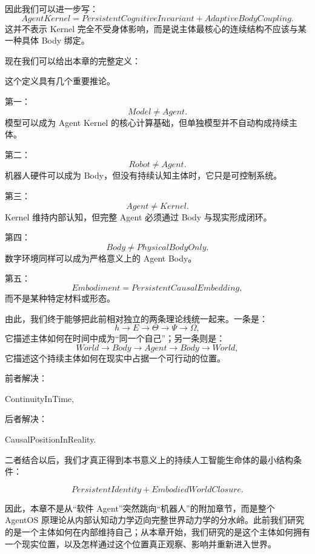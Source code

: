 因此我们可以进一步写：
\[
\boxed{
AgentKernel
=
PersistentCognitiveInvariant
+
AdaptiveBodyCoupling.
}
\]
这并不表示 Kernel 完全不受身体影响，而是说主体最核心的连续结构不应该与某一种具体 Body 绑定。

现在我们可以给出本章的完整定义：

\begin{statementbox}
\centering
{}
\end{statementbox}

这个定义具有几个重要推论。

第一：
\[
\boxed{
Model\neq Agent.
}
\]
模型可以成为 Agent Kernel 的核心计算基础，但单独模型并不自动构成持续主体。

第二：
\[
\boxed{
Robot\neq Agent.
}
\]
机器人硬件可以成为 Body，但没有持续认知主体时，它只是可控制系统。

第三：
\[
\boxed{
Agent\neq Kernel.
}
\]
Kernel 维持内部认知，但完整 Agent 必须通过 Body 与现实形成闭环。

第四：
\[
\boxed{
Body\neq PhysicalBodyOnly.
}
\]
数字环境同样可以成为严格意义上的 Agent Body。

第五：
\[
\boxed{
Embodiment
=
PersistentCausalEmbedding,
}
\]
而不是某种特定材料或形态。

由此，我们终于能够把此前相对独立的两条理论线统一起来。一条是：
\[
h
\rightarrow
E
\rightarrow
\Theta
\rightarrow
\Psi
\rightarrow
\Omega,
\]
它描述主体如何在时间中成为“同一个自己”；另一条则是：
\[
World
\rightarrow
Body
\rightarrow
Agent
\rightarrow
Body
\rightarrow
World,
\]
它描述这个持续主体如何在现实中占据一个可行动的位置。

前者解决：
\begin{statementbox}
ContinuityInTime,
\end{statementbox}
后者解决：
\begin{statementbox}
CausalPositionInReality.
\end{statementbox}
二者结合以后，我们才真正得到本书意义上的持续人工智能生命体的最小结构条件：

\[
\boxed{
PersistentIdentity
+
EmbodiedWorldClosure.
}
\]

因此，本章不是从“软件 Agent”突然跳向“机器人”的附加章节，而是整个 AgentOS 原理论从内部认知动力学迈向完整世界动力学的分水岭。此前我们研究的是一个主体如何在内部维持自己；从本章开始，我们研究的是这个主体如何拥有一个现实位置，以及怎样通过这个位置真正观察、影响并重新进入世界。
